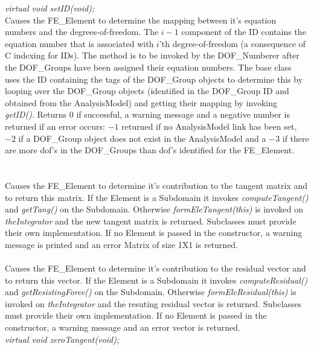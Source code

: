 {\em virtual void setID(void);} \\
Causes the FE\_Element to determine the mapping between it's equation
numbers and the degrees-of-freedom. The $i-1$ component of the ID
contains the equation number that is associated with $i$'th
degree-of-freedom (a consequence of C indexing for IDs). The method is
to be invoked by the DOF\_Numberer after the DOF\_Groups have been assigned
their equation numbers. The base class uses the ID containing the tags of
the DOF\_Group objects to determine this by looping over the
DOF\_Group objects (identified in the DOF\_Group ID and obtained from
the AnalysisModel) and getting their mapping by invoking {\em
getID()}. Returns $0$ if successful, a warning message and a
negative number is returned if an error occurs:
$-1$ returned if no AnalysisModel link has been set, $-2$ if a
DOF\_Group object does not exist in the AnalysisModel and a $-3$ if
there are more dof's in the DOF\_Groups than dof's identified for the
FE\_Element. \\


  \\
 \\ 
Causes the FE\_Element to determine it's contribution to the tangent
matrix and to return this matrix. If the Element is a
Subdomain it invokes {\em computeTangent()} and {\em getTang()} on the
Subdomain. Otherwise {\em formEleTangent(this)} is invoked on {\em
theIntegrator} and the new tangent matrix is returned.
Subclasses must provide their own implementation. If no Element is
passed in the constructor, a warning message is
printed and an error Matrix of size 1X1 is returned. \\


 \\
Causes the FE\_Element to determine it's contribution to the residual
vector and to return this vector. If the Element is a Subdomain it invokes
{\em computeResidual()} and {\em getResistingForce()} on the Subdomain.
Otherwise {\em formEleResidual(this)} is invoked on {\em theIntegrator}
and the resuting residual vector is returned. 
Subclasses must provide their own implementation. If no Element is
passed in the constructor, a warning message and an error vector is
returned. \\


{\em virtual void zeroTangent(void);} 

